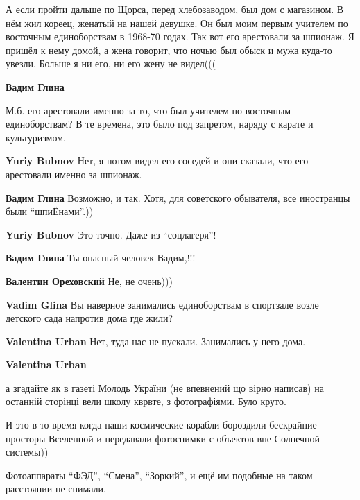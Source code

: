 \begin{itemize}
\begin{itemize}
\end{itemize} %


А если пройти дальше по Щорса, перед хлебозаводом, был дом с магазином. В нём
жил кореец, женатый на нашей девушке. Он был моим первым учителем по восточным
единоборствам в 1968-70 годах. Так вот его арестовали за шпионаж. Я пришёл к
нему домой, а жена говорит, что ночью был обыск и мужа куда-то увезли. Больше я
ни его, ни его жену не видел(((

\begin{itemize} %
\textbf{Вадим Глина} 

М.б. его арестовали именно за то, что был учителем по восточным единоборствам?
В те времена, это было под запретом, наряду с карате и культуризмом.

\begin{itemize} %
\textbf{Yuriy Bubnov} Нет, я потом видел его соседей и они сказали, что его арестовали именно за шпионаж.

\textbf{Вадим Глина} Возможно, и так. Хотя, для советского обывателя, все иностранцы были \enquote{шпиЁнами}.))

\textbf{Yuriy Bubnov} Это точно. Даже из \enquote{соцлагеря}!
\end{itemize} %

\textbf{Вадим Глина} Ты опасный человек Вадим,!!!


\begin{itemize} %
\textbf{Валентин Ореховский} Не, не очень)))
\end{itemize} %

\textbf{Vadim Glina} Вы наверное занимались единоборствам в спортзале возле детского сада напротив дома где жили?

\begin{itemize} %
\textbf{Valentina Urban} Нет, туда нас не пускали. Занимались у него дома.

\textbf{Valentina Urban} 

а згадайте як в газеті Молодь України (не впевнений що вірно написав) на останній
сторінці вели школу кврвте, з фотографіями. Було круто.

\end{itemize} %

\end{itemize} %


И это в то время когда наши космические корабли бороздили бескрайние просторы
Вселенной и передавали фотоснимки с объектов вне Солнечной системы))



Фотоаппараты \enquote{ФЭД}, \enquote{Смена}, \enquote{Зоркий}, и ещё им подобные на таком расстоянии не
снимали.


\end{itemize} %
